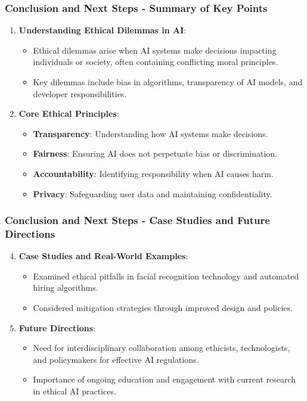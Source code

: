 \documentclass[aspectratio=169]{beamer}
\begin{document}
\begin{frame}[fragile]
    \frametitle{Conclusion and Next Steps - Summary of Key Points}
    
    \begin{enumerate}
        \item \textbf{Understanding Ethical Dilemmas in AI}:
        \begin{itemize}
            \item Ethical dilemmas arise when AI systems make decisions impacting individuals or society, often containing conflicting moral principles.
            \item Key dilemmas include bias in algorithms, transparency of AI models, and developer responsibilities.
        \end{itemize}

        \item \textbf{Core Ethical Principles}:
        \begin{itemize}
            \item \textbf{Transparency}: Understanding how AI systems make decisions.
            \item \textbf{Fairness}: Ensuring AI does not perpetuate bias or discrimination.
            \item \textbf{Accountability}: Identifying responsibility when AI causes harm.
            \item \textbf{Privacy}: Safeguarding user data and maintaining confidentiality.
        \end{itemize}
    \end{enumerate}
\end{frame}

\begin{frame}[fragile]
    \frametitle{Conclusion and Next Steps - Case Studies and Future Directions}
    
    \begin{enumerate}
        \setcounter{enumi}{3}
        \item \textbf{Case Studies and Real-World Examples}:
        \begin{itemize}
            \item Examined ethical pitfalls in facial recognition technology and automated hiring algorithms.
            \item Considered mitigation strategies through improved design and policies.
        \end{itemize}

        \item \textbf{Future Directions}:
        \begin{itemize}
            \item Need for interdisciplinary collaboration among ethicists, technologists, and policymakers for effective AI regulations.
            \item Importance of ongoing education and engagement with current research in ethical AI practices.
        \end{itemize}
    \end{enumerate}
\end{frame}
\end{document}
